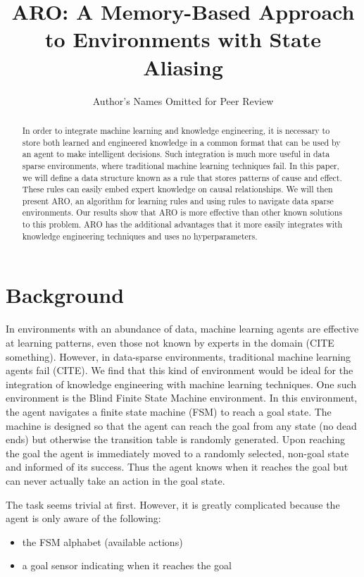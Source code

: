 \documentclass[letterpaper]{article} %
\title{ARO:  A Memory-Based Approach to Environments with State Aliasing }
\author{Author's Names Omitted for Peer Review
}
\begin{document}
\maketitle

\begin{abstract}

In order to integrate machine learning and knowledge engineering, it is necessary
to store both learned and engineered knowledge in a common format that can be used
by an agent to make intelligent decisions. Such integration is much more useful in data sparse environments, where traditional machine learning techniques fail.
In this paper, we will define a data structure known as a rule that stores patterns of cause and effect. These rules can easily embed expert knowledge on causal relationships. We will then present ARO, an algorithm for learning rules and using rules to navigate data sparse environments. Our results show that ARO is more effective than other known solutions to this problem. ARO has the additional advantages that it more easily integrates with knowledge engineering techniques and uses no hyperparameters.

\end{abstract}

\noindent




\section{Background}
In environments with an abundance of data, machine learning agents are effective at learning patterns, even those not known by experts in the domain (CITE something). However, in data-sparse environments, traditional machine learning agents fail (CITE). We find that this kind of environment would be ideal for the integration of knowledge engineering with machine learning techniques. One such environment is the Blind Finite State Machine
environment.  In this environment, the agent navigates a finite state
machine (FSM) \cite{Hopcroft06} to reach a goal state.  The machine is
designed so that the agent can reach the goal from any state (no dead
ends) but otherwise the transition table is randomly generated.  Upon
reaching the goal the agent is immediately moved to a randomly
selected, non-goal state and informed of its success.  Thus the agent
knows when it reaches the goal but can never actually take an action
in the goal state.

The task seems trivial at first.  However, it is greatly complicated
because the agent is only aware of the following:
\begin{itemize}
\item the FSM alphabet (available actions)
\item a goal sensor indicating when it reaches the goal
\end{itemize}
\end{document}
